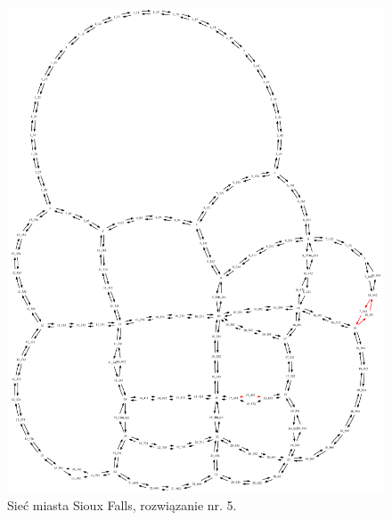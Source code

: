 \documentclass[twoside,12pt]{report}
\begin{document}
\begin{figure}[ht]
\centering
\includegraphics[totalheight=0.580\textheight, angle=90]{img/sioux-out/5/network2}
\caption{Sieć miasta Sioux Falls, rozwiązanie nr. 5.}
\label{sioux5}
\end{figure}
\end{document}
